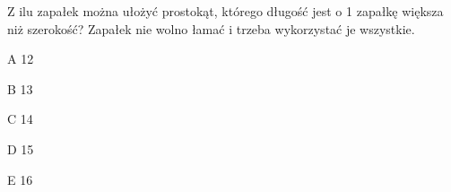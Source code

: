 \begin{tresc}
Z ilu zapałek można ułożyć prostokąt, którego długość jest o 1 zapałkę większa niż szerokość? Zapałek nie wolno łamać i trzeba wykorzystać je wszystkie.
\end{tresc}
\begin{wariant}{A} 12 \end{wariant}
\begin{wariant}{B} 13 \end{wariant}
\begin{wariant}{C} 14 \end{wariant}
\begin{wariant}{D} 15 \end{wariant}
\begin{wariant}{E} 16 \end{wariant}
